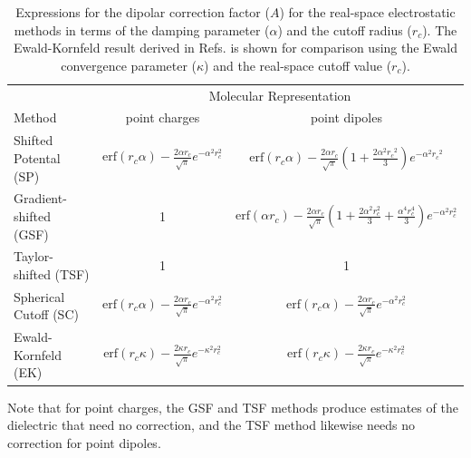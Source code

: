 \begin{table}
	\begin{center}
  	\caption{Expressions for the dipolar correction factor ($A$) for the
    real-space electrostatic methods in terms of the damping parameter 
    ($\alpha$) and the cutoff radius ($r_c$).  The Ewald-Kornfeld result 
    derived in Refs.\cite{Adams80,Adams81,NeumannI83} is shown
    for comparison using the Ewald convergence parameter ($\kappa$)
    and the real-space cutoff value ($r_c$). } 
		\label{tab:A}
	\begin{tabular}{l|c|c}
	\hline       
	& \multicolumn{2}{c}{Molecular Representation} \\ 
	Method & point charges & point dipoles  \\ \hline
	\colrule
 		Shifted Potental (SP) & $ \mathrm{erf}(r_c \alpha) - \frac{2
                               \alpha r_c}{\sqrt{\pi}} e^{-\alpha^2
                               r_c^2}$ & $\mathrm{erf}(r_c \alpha)
                                         -\frac{2 \alpha
                                         r_c}{\sqrt{\pi}}\left(1+\frac{2\alpha^2
                                         {r_c}^2}{3}
                                         \right)e^{-\alpha^2{r_c}^2}
                                         $\\ \colrule
	Gradient-shifted  (GSF) & 1 & $\mathrm{erf}(\alpha  r_c)-\frac{2
                              \alpha  r_c}{\sqrt{\pi}}  \left(1 +
                              \frac{2 \alpha^2 r_c^2}{3} +
                              \frac{\alpha^4
                              r_c^4}{3}\right)e^{-\alpha^2 r_c^2} $ \\ \colrule
	Taylor-shifted  (TSF) & 1 & 1  \\ \colrule
	Spherical Cutoff (SC)& $\mathrm{erf}(r_c \alpha) -
                        \frac{2 \alpha r_c}{\sqrt{\pi}} e^{-\alpha^2
                        r_c^2}$ & $\mathrm{erf}(r_c \alpha) -
                        \frac{2 \alpha r_c}{\sqrt{\pi}} e^{-\alpha^2
                        r_c^2}$ \\ 
	Ewald-Kornfeld (EK) & $\mathrm{erf}(r_c \kappa) -
                      \frac{2 \kappa r_c}{\sqrt{\pi}} e^{-\kappa^2
                      r_c^2}$ & $\mathrm{erf}(r_c \kappa) -
                      \frac{2 \kappa r_c}{\sqrt{\pi}} e^{-\kappa^2
                      r_c^2}$  \\ \hline
	\end{tabular}
	\end{center}
\end{table}
Note that for point charges, the GSF and TSF methods produce estimates
of the dielectric that need no correction, and the TSF method likewise
needs no correction for point dipoles. 

